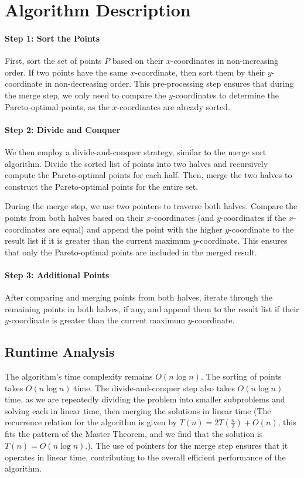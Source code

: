 \documentclass{article}
\begin{document}
\section*{Algorithm Description}

\paragraph{Step 1: Sort the Points} First, sort the set of points $P$ based on their $x$-coordinates in non-increasing order. If two points have the same $x$-coordinate, then sort them by their $y$-coordinate in non-decreasing order. This pre-processing step ensures that during the merge step, we only need to compare the $y$-coordinates to determine the Pareto-optimal points, as the $x$-coordinates are already sorted.

\paragraph{Step 2: Divide and Conquer} We then employ a divide-and-conquer strategy, similar to the merge sort algorithm. Divide the sorted list of points into two halves and recursively compute the Pareto-optimal points for each half. Then, merge the two halves to construct the Pareto-optimal points for the entire set. 

During the merge step, we use two pointers to traverse both halves. Compare the points from both halves based on their $x$-coordinates (and $y$-coordinates if the $x$-coordinates are equal) and append the point with the higher $y$-coordinate to the result list if it is greater than the current maximum $y$-coordinate. This ensures that only the Pareto-optimal points are included in the merged result.

\paragraph{Step 3: Additional Points} After comparing and merging points from both halves, iterate through the remaining points in both halves, if any, and append them to the result list if their $y$-coordinate is greater than the current maximum $y$-coordinate.

\subsection*{Runtime Analysis}
The algorithm's time complexity remains $O(n \log n)$. The sorting of points takes $O(n \log n)$ time. The divide-and-conquer step also takes $O(n \log n)$ time, as we are repeatedly dividing the problem into smaller subproblems and solving each in linear time, then merging the solutions in linear time (The recurrence relation for the algorithm is given by $T(n) = 2T\left(\frac{n}{2}\right) + O(n)$, this fits the pattern of the Master Theorem, and we find that the solution is 
$T(n) = O(n \log n)$.). The use of pointers for the merge step ensures that it operates in linear time, contributing to the overall efficient performance of the algorithm.
\end{document}
